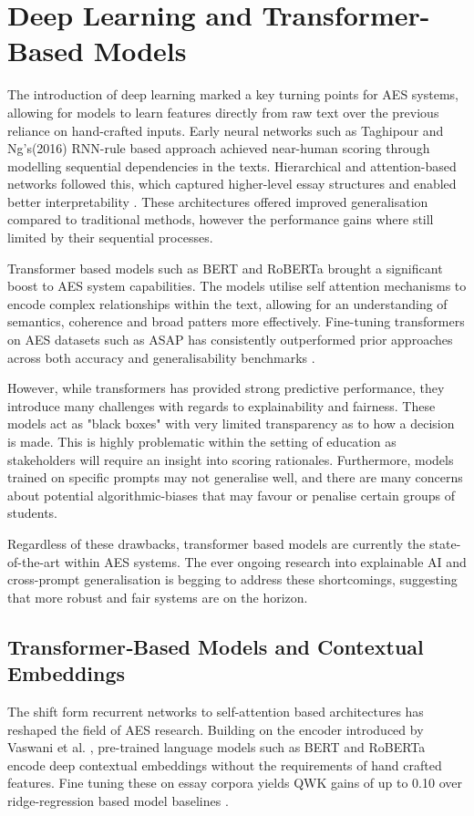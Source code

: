 \documentclass[12pt,a4paper]{report}
\begin{document}
\section{Deep Learning and Transformer-Based Models}
The introduction of deep learning marked a key turning points for AES systems, allowing for models to learn features directly from raw text over the previous reliance on hand-crafted inputs. Early neural networks such as Taghipour and Ng's(2016) RNN-rule based approach achieved near-human scoring through modelling sequential dependencies in the texts. Hierarchical and attention-based networks followed this, which captured higher-level essay structures and enabled better interpretability \citep{yang2016han}. These architectures offered improved generalisation compared to traditional methods, however the performance gains where still limited by their sequential processes.

Transformer based models such as BERT and RoBERTa brought a significant boost to AES system capabilities. The models utilise self attention mechanisms to encode complex relationships within the text, allowing for an understanding of semantics, coherence and broad patters more effectively. Fine-tuning transformers on AES datasets such as ASAP has consistently outperformed prior approaches across both accuracy and generalisability benchmarks \citep{taghipour2016neural}.

However, while transformers has provided strong predictive performance, they introduce many challenges with regards to explainability and fairness. These models act as "black boxes" with very limited transparency as to how a decision is made\citep{lundberg2017unified}. This is highly problematic within the setting of education as stakeholders will require an insight into scoring rationales. Furthermore, models trained on specific prompts may not generalise well, and there are many concerns about potential algorithmic-biases that may favour or penalise certain groups of students.

Regardless of these drawbacks, transformer based models are currently the state-of-the-art within AES systems. The ever ongoing research into explainable AI and cross-prompt generalisation is begging to address these shortcomings, suggesting that more robust and fair systems are on the horizon.

\subsection{Transformer‑Based Models and Contextual Embeddings}
The shift form recurrent networks to self-attention based architectures has reshaped the field of AES research. Building on the encoder introduced by Vaswani et al. \citep{vaswani2017attention}, pre-trained language models such as BERT \citep{devlin2019bert} and RoBERTa \citep{liu2019roberta} encode deep contextual embeddings without the requirements of hand crafted features. Fine tuning these on essay corpora yields QWK gains of up to 0.10 over ridge-regression based model baselines \citep{taghipour2016neural}.
\end{document}
